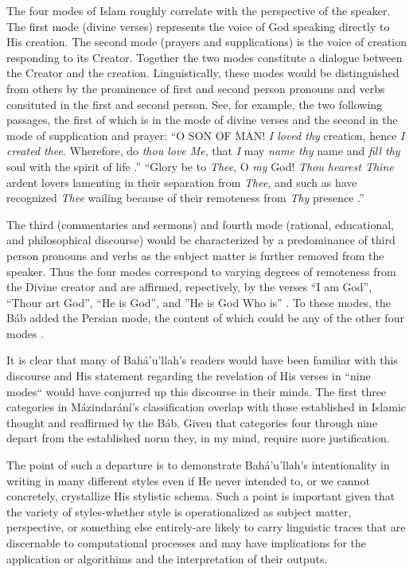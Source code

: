 \documentclass[12pt, oneside]{report}
\begin{document}
\par 
The four modes of Islam roughly correlate with the perspective of the speaker. The first mode (divine verses) represents the voice of God speaking directly to His creation. The second mode (prayers and supplications) is the voice of creation responding to its Creator. Together the two modes constitute a dialogue between the Creator and the creation. Linguistically, these modes would be distinguished from others by the prominence of first and second person pronouns and verbs consituted in the first and second person. See, for example, the two following passages, the first of which is in the mode of divine verses and the second in the mode of supplication and prayer: ``O SON OF MAN! \emph{I loved thy} creation, hence \emph{I created thee}. Wherefore, do \emph{thou love Me}, that \emph{I} may \emph{name thy} name and \emph{fill thy} soul with the spirit of life \cite{bahaullah_hidden_2002}.'' ``Glory be to \emph{Thee}, O \emph{my} God!  \emph{Thou hearest Thine} ardent lovers lamenting in their separation from \emph{Thee}, and such as have recognized \emph{Thee} wailing because of their remoteness from \emph{Thy} presence \cite{}.''
\par 
The third (commentaries and sermons) and fourth mode (rational, educational, and philosophical discourse) would be characterized by a predominance of third person pronouns and verbs as the subject matter is further removed from the speaker. Thus the four modes correspond to varying degrees of remoteness from the Divine creator and are affirmed, repectively, by the verses ``I am God'', ``Thour art God'', ``He is God'', and ''He is God Who is'' \cite{saiedi_gate_2008}. To these modes, the B\'{a}b added the Persian mode, the content of which could be any of the other four modes \cite{saiedi_gate_2008}.
\par 
It is clear that many of Bah\'{a}'u'llah's readers would have been familiar with this discourse and His statement regarding the revelation of His verses in ``nine modes`` would have conjurred up this discourse in their minds. The first three categories in M\'{a}zindar\'{a}n\'{i}'s classification overlap with those established in Islamic thought and reaffirmed by the B\'{a}b. Given that categories four through nine depart from the established norm they, in my mind, require more justification. 
\par 
The point of such a departure is to demonstrate Bah\'{a}'u'llah's intentionality in writing in many different styles even if He never intended to, or we cannot concretely, crystallize His stylistic schema. Such a point is important given that the variety of styles-whether style is operationalized as subject matter, perspective, or something else entirely-are likely to carry linguistic traces that are discernable to computational processes and may have implications for the application or algorithims and the interpretation of their outputs. 
\end{document}
